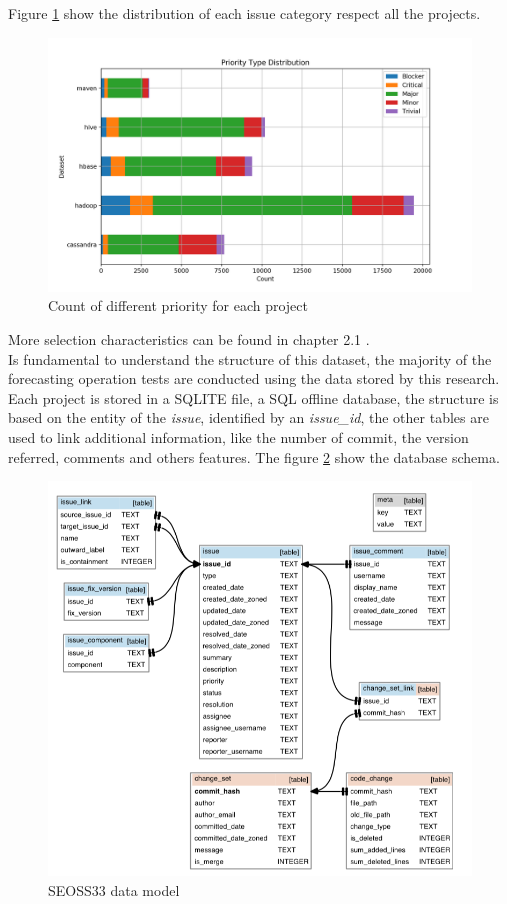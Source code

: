 \documentclass[%
    corpo=12pt,
    twoside,
    oldstyle,
    autoretitolo,
    greek,
    evenboxes,
]{toptesi}
\begin{document}
Figure \ref{fig:prior} show the distribution of each issue category respect all the projects.

\begin{figure}[!ht]
  \includegraphics[width=\linewidth]{figure/prior.png}
  \caption{Count of different priority for each project}
  \label{fig:prior}
\end{figure}

More selection characteristics can be found in chapter 2.1 \cite{SEOSS33}.\\
Is fundamental to understand the structure of this dataset, the majority of the forecasting operation tests are conducted using the data stored by this research.\\
Each project is stored in a SQLITE file, a SQL offline database, the structure is based on the entity of the \textit{issue}, identified by an \textit{issue\_id}, the other tables are used to link additional information, like the number of commit, the version referred, comments and others features. The figure \ref{fig:seoss33_db} show the database schema.

\begin{figure}[!ht]
  \includegraphics[width=\linewidth]{figure/seoss33_db_schema.png}
  \caption{SEOSS33 data model}
  \label{fig:seoss33_db}
\end{figure}
\end{document}
